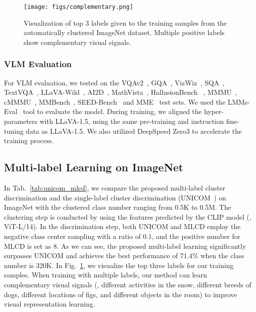 \begin{figure}[t!]
\centering
\texttt{[image: figs/complementary.png]}
\caption{Visualization of top 3 labels given to the training samples from the automatically clustered ImageNet dataset. Multiple positive labels show complementary visual signals.}
\label{fig:pruityconflict_in1k}
\end{figure}

\subsubsection{VLM Evaluation}
For VLM evaluation, we tested on the VQAv2~\cite{vlm_vqav2}, GQA~\cite{vlm_gqa}, VizWiz~\cite{vlm_vizwiz}, SQA~\cite{vlm_sqa}, TextVQA~\cite{vlm_text_vqa}, LLaVA-Wild~\cite{liu2024llava_V1_5}, AI2D~\cite{vlm_ai2d}, MathVista~\cite{vlm_mathvista}, HallusionBench
~\cite{vlm_hb}, MMMU~\cite{vlm_mmmu}, cMMMU~\cite{vlm_cmmmu}, MMBench~\cite{vlm_mmbench}, SEED-Bench~\cite{vlm_seedbench} and MME~\cite{vlm_mme} test sets. We used the LMMs-Eval~\cite{lmms_eval2024} tool to evaluate the model. During training, we aligned the hyper-parameters with LLaVA-1.5, using the same pre-training and instruction fine-tuning data as LLaVA-1.5. We also utilized DeepSpeed Zero3\cite{rajbhandari2020zero} to accelerate the training process.

\subsection{Multi-label Learning on ImageNet}

In Tab.~\ref{tab:unicom_mlcd}, we compare the proposed multi-label cluster discrimination and the single-label cluster discrimination (UNICOM~\cite{an2023unicom}) on ImageNet with the clustered class number ranging from 0.5K to 0.5M. The clustering step is conducted by using the features predicted by the CLIP model (\ie, ViT-L/14). In the discrimination step, both UNICOM and MLCD employ the negative class center sampling with a ratio of $0.1$, and the positive number for MLCD is set as $8$. As we can see, the proposed multi-label learning significantly surpasses UNICOM and achieves the best performance of $71.4\%$ when the class number is 320K. In Fig.~\ref{fig:pruityconflict_in1k}, we visualize the top three labels for our training samples. 
When training with multiple labels, our method can
learn complementary visual signals (\eg, different activities in the snow, different breeds of dogs, different locations of figs, and different objects in the room) to improve visual representation learning. 

